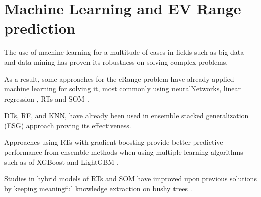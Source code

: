 \section{Machine Learning and EV Range prediction}

The use of machine learning for a multitude
of cases \citep{machineLearningCaseStudy} in fields such as 
big data \citep{machineLearningBigData, machineLearningBigData2}
and data mining \citep{businessDataMining} has 
proven its robustness on solving complex problems.

As a result, some approaches for the \gls{eRange}
problem have already applied machine learning 
for solving it, most commonly using \gls{neuralNetworks}, 
linear regression \citep{eRangeMachineLearningNeuralnetworkMLR},
\gls{RTs} and \gls{SOM} \citep{eRangeMachineLearningGHSOM}.

\gls{DTs}, \gls{RF}, and \gls{KNN}, have already been 
used in ensemble stacked generalization (ESG) approach 
\citep{eRangeMachineLearningEnsemble} proving its 
effectiveness.

Approaches using \gls{RTs} with gradient boosting 
provide better predictive performance from
ensemble methods when using multiple learning algorithms
such as of \gls{XGBoost} and \gls{LightGBM}
\citep{machineLearningERangeGradientBoostRts}.

Studies in hybrid models of \gls{RTs} and \gls{SOM} 
have improved upon previous solutions by
keeping meaningful knowledge extraction on bushy trees
\citep{machineLearningERangeSOMandRts}.

